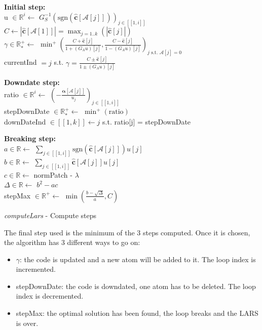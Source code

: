 \documentclass{ipol}
\newcommand{\dsize}{k}
\newcommand{\code}{\bm{\alpha}}
\newcommand{\clars}{\hat{\textbf{c}}}
\newcommand{\A}{\mathcal{A}}
\begin{document}
\begin{algorithm}[H]
\textbf{Initial step:}\\
\vspace{0.5mm}
u $\in \mathbb{R}^i \leftarrow$ $G_S^{-1} (\text{sgn}(\clars[\A[j]]))_{j\in [\![1, i]\!]}$\\
$C \leftarrow |\clars[\A[1]]| = \max_{j=1..\dsize}(|\clars[j]|)$\\
$\gamma \in \mathbb{R}^+_* \leftarrow$ $\min^+\left(\frac{C + \clars[j]}{1 + (G_Au)[j]}, \frac{C - \clars[j]}{1 - (G_Au)[j]}\right)_{j \text{ s.t. } \A[j] = 0}$\\
currentInd $=j$ s.t. $\gamma = \frac{C \pm \clars[j]}{1 \pm (G_Au)[j]}$\\
\vspace{2mm}

\textbf{Downdate step:}\\
\vspace{0.5mm}
ratio $\in \mathbb{R}^i \leftarrow$ $\left(-\frac{\code[\A[j]]}{u_j}\right)_{j\in[\![1, i]\!]}$\\
stepDownDate $\in \mathbb{R}^+_* \leftarrow$ $\min^+(\text{ratio})$ \\
downDateInd $\in [\![1, \dsize]\!] \leftarrow j$ s.t. ratio[j] =	stepDownDate\\
\vspace{2mm}

\textbf{Breaking step:}\\
\vspace{0.5mm}
$a \in \mathbb{R} \leftarrow$ $\sum_{j \in [\![1, i]\!]} \text{sgn}(\clars[\A[j]])u[j]$\\
$b \in \mathbb{R} \leftarrow$ $\sum_{j \in [\![1, i]\!]} \clars[\A[j]] u[j]$\\
$c \in \mathbb{R} \leftarrow$ normPatch - $\lambda$\\
$\Delta \in \mathbb{R} \leftarrow$ $b^2 - ac$ \\
stepMax $\in \mathbb{R}^+ \leftarrow$ $\min(\frac{b - \sqrt{\Delta}}{a}, C)$ \\
\vspace{2mm}

\caption{\textit{computeLars} - Compute steps}
\end{algorithm}

\newpage

\noindent The final step used is the minimum of the 3 steps computed. Once it is chosen, the algorithm has 3 different ways to go on:
\begin{itemize}
	\item $\gamma$: the code is updated and a new atom will be added to it. The loop index is incremented.
	\item stepDownDate: the code is downdated, one atom has to be deleted. The loop index is decremented.
	\item stepMax: the optimal solution has been found, the loop breaks and the LARS is over.
\end{itemize}
\end{document}
